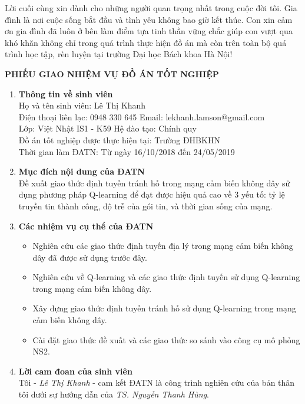 \documentclass[12pt]{report}
\begin{document}
Lời cuối cùng xin dành cho những người quan trọng nhất trong cuộc đời tôi. Gia đình là nơi cuộc sống bắt đầu và tình yêu không bao giờ kết thúc. Con xin cảm ơn gia đình đã luôn ở bên làm điểm tựa tinh thần vững chắc giúp con vượt qua khó khăn không chỉ trong quá trình thực hiện đồ án mà còn trên toàn bộ quá trình học tập, rèn luyện tại trường Đại học Bách khoa Hà Nội! 
\newpage
\begin{center}
\large \textbf{PHIẾU GIAO NHIỆM VỤ ĐỒ ÁN TỐT NGHIỆP}
\end{center}
\begin{enumerate}
\item \textbf{Thông tin về sinh viên} \\
Họ và tên sinh viên: Lê Thị Khanh \\
Điện thoại liên lạc: 0948 330 645 \hspace{50pt} Email: lekhanh.lamson@gmail.com \\
Lớp: Việt Nhật IS1 - K59 \hspace{86.5pt} Hệ đào tạo: Chính quy \\
Đồ án tốt nghiệp được thực hiện tại: Trường ĐHBKHN\\
Thời gian làm ĐATN: Từ ngày 16/10/2018 đến 24/05/2019
\item \textbf{Mục đích nội dung của ĐATN} \\
Đề xuất giao thức định tuyến tránh hố trong mạng cảm biến không dây sử dụng phương pháp Q-learning để đạt được hiệu quả cao về 3 yếu tố: tỷ lệ truyền tin thành công, độ trễ của gói tin, và thời gian sống của mạng.
\item \textbf{Các nhiệm vụ cụ thể của ĐATN}
\begin{itemize}
\item Nghiên cứu các giao thức định tuyến địa lý trong mạng cảm biến không dây đã được sử dụng trước đây.
\item Nghiên cứu về Q-learning và các giao thức định tuyến sử dụng Q-learning trong mạng cảm biến không dây.
\item Xây dựng giao thức định tuyến tránh hố sử dụng Q-learning trong mạng cảm biến không dây.
\item Cài đặt giao thức đề xuất và các giao thức so sánh vào công cụ mô phỏng NS2.
\end{itemize}
\item \textbf{Lời cam đoan của sinh viên}\\
Tôi - \textit{Lê Thị Khanh} - cam kết ĐATN là công trình nghiên cứu của bản thân tôi dưới sự hướng dẫn của \textit{TS. Nguyễn Thanh Hùng}.\\

\end{enumerate}
\end{document}
